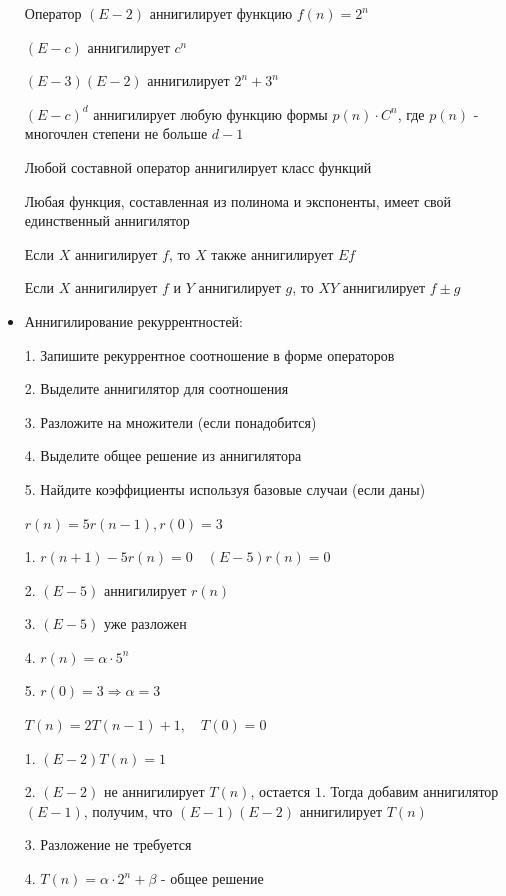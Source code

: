\documentclass[12pt]{article}
\begin{document}
\begin{itemize}
        \Ex Оператор $(E - 2)$ аннигилирует функцию $f(n) = 2^n$

        \Exs $(E - c)$ аннигилирует $c^n$

        \Exs $(E - 3)(E - 2)$ аннигилирует $2^n + 3^n$

        \Exs $(E - c)^d$ аннигилирует любую функцию формы $p(n) \cdot C^n$, где $p(n)$ - многочлен степени не больше $d - 1$

        \Nota Любой составной оператор аннигилирует класс функций

        \Notas Любая функция, составленная из полинома и экспоненты, имеет свой единственный аннигилятор

        Если $X$ аннигилирует $f$, то $X$ также аннигилирует $Ef$

        Если $X$ аннигилирует $f$ и $Y$ аннигилирует $g$, то $XY$ аннигилирует $f \pm g$

        \vspace{5mm}

        \item Аннигилирование рекуррентностей:

        1. Запишите рекуррентное соотношение в форме операторов

        2. Выделите аннигилятор для соотношения

        3. Разложите на множители (если понадобится)

        4. Выделите общее решение из аннигилятора

        5. Найдите коэффициенты используя базовые случаи (если даны)

        \Ex $r(n) = 5r(n - 1), r(0) = 3$

        1. $r(n + 1) - 5r(n) = 0 \quad (E - 5)r(n) = 0$

        2. $(E - 5)$ аннигилирует $r(n)$

        3. $(E - 5)$ уже разложен

        4. $r(n) = \alpha \cdot 5^n$

        5. $r(0) = 3 \Longrightarrow \alpha = 3$

        \Ex $T(n) = 2T(n - 1) + 1, \quad T(0) = 0$

        1. $(E - 2)T(n) = 1$

        2. $(E - 2)$ не аннигилирует $T(n)$, остается $1$. Тогда добавим аннигилятор $(E - 1)$, получим, что $(E - 1)(E - 2)$ аннигилирует $T(n)$

        3. Разложение не требуется

        4. $T(n) = \alpha \cdot 2^n + \beta$ - общее решение


\end{itemize}
\end{document}
